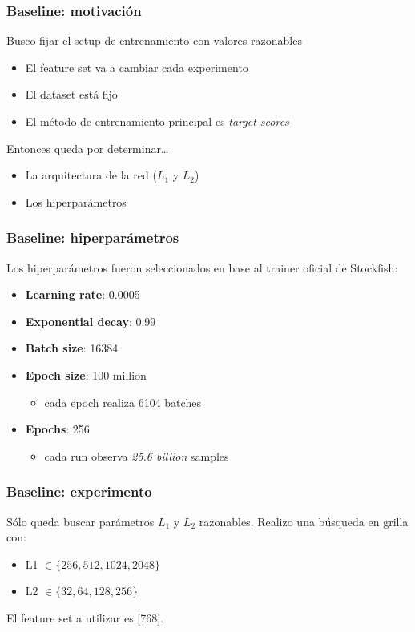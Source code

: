 \begin{frame}
\frametitle{Baseline: motivación}
Busco fijar el setup de entrenamiento con valores razonables \pause
\begin{itemize}
\item El feature set va a cambiar cada experimento \pause
\item El dataset está fijo \pause
\item El método de entrenamiento principal es \textit{target scores} \pause
\end{itemize}
Entonces queda por determinar\dots
\begin{itemize}
\item La arquitectura de la red ($L_1$ y $L_2$) \pause
\item Los hiperparámetros
\end{itemize}
\end{frame}


\begin{frame}
\frametitle{Baseline: hiperparámetros}
Los hiperparámetros fueron seleccionados en base al trainer oficial de Stockfish: \pause
\begin{itemize}
\item \textbf{Learning rate}: 0.0005 \pause
\item \textbf{Exponential decay}: 0.99 \pause
\item \textbf{Batch size}: 16384 \pause
\item \textbf{Epoch size}: 100 million \pause
\begin{itemize}
    \item cada epoch realiza 6104 batches \pause
\end{itemize}
\item \textbf{Epochs}: 256
\begin{itemize}
    \item cada run observa \textit{25.6 billion} samples
\end{itemize}
\end{itemize}
\end{frame}


\begin{frame}
\frametitle{Baseline: experimento}
Sólo queda buscar parámetros $L_1$ y $L_2$ razonables. Realizo una búsqueda en grilla con:
\begin{itemize}
\item L1 $\in \{256, 512, 1024, 2048\}$
\item L2 $\in \{32, 64, 128, 256\}$
\end{itemize}
El feature set a utilizar es [768].
\end{frame}

